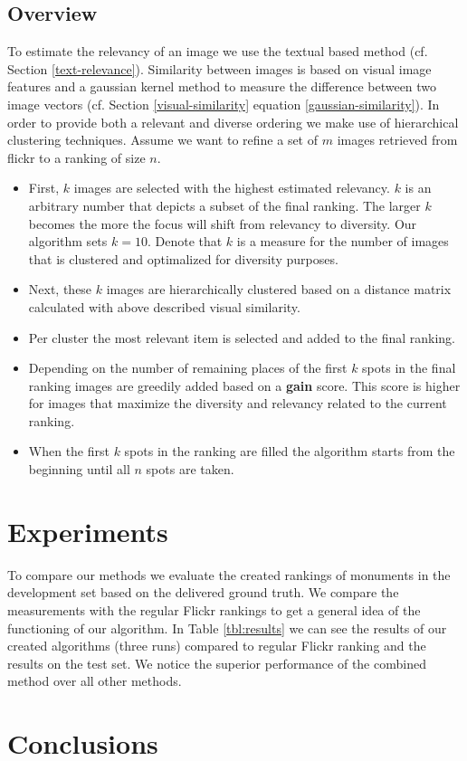 \documentclass{acm_proc_article-me11_tweaked}
\begin{document}
\subsection{Overview}
To estimate the relevancy of an image we use the textual based method (cf. Section \ref{text-relevance}).
Similarity between images is based on visual image features and a gaussian kernel method to measure the difference between two image vectors (cf. Section \ref{visual-similarity} equation \ref{gaussian-similarity}).
In order to provide both a relevant and diverse ordering we make use of hierarchical clustering techniques.
Assume we want to refine a set of $m$ images retrieved from flickr to a ranking of size $n$.
\begin{itemize}
 \item First, $k$ images are selected with the highest estimated relevancy. $k$ is an arbitrary number that depicts a subset of the final ranking. 
 The larger $k$ becomes the more the focus will shift from relevancy to diversity. Our algorithm sets $k = 10$. Denote that $k$ is a measure for the number of images that is clustered and optimalized for diversity purposes.
 \item Next, these $k$ images are hierarchically clustered based on a distance matrix calculated with above described visual similarity.
 \item Per cluster the most relevant item is selected and added to the final ranking.
 \item Depending on the number of remaining places of the first $k$ spots in the final ranking images are greedily added based on a \textbf{gain} score.
 This score is higher for images that maximize the diversity and relevancy related to the current ranking.
 \item When the first $k$ spots in the ranking are filled the algorithm starts from the beginning until all $n$ spots are taken.
 
\end{itemize}




\section{Experiments}
To compare our methods we evaluate the created rankings of monuments in the development set based on the delivered ground truth.
We compare the measurements with the regular Flickr rankings to get a general idea of the functioning of our algorithm.
In Table \ref{tbl:results} we can see the results of our created algorithms (three runs) compared to regular Flickr ranking and the results on the test set.
 We notice the superior performance of the combined method over all other methods.



\section{Conclusions}


%

\end{document}
